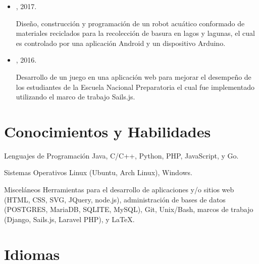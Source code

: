 \documentclass{curriculum-vitae}
\begin{document}
    \begin{itemize}
      \item {}, 2017.
        
        Diseño, construcción y programación de un robot acuático conformado de
        materiales reciclados para la recolección de basura en lagos y lagunas,
        el cual es controlado por una aplicación Android y un dispositivo
        Arduino.
        
      \item {}, 2016.

        Desarrollo de un juego en una aplicación web para mejorar el desempeño
        de los estudiantes de la Escuela Nacional Preparatoria el cual fue
        implementado utilizando el marco de trabajo Sails.js.
      
    \end{itemize}

  \section{Conocimientos y Habilidades}
  
    \skill%
      {Lenguajes de Programación}
      {Java, C/C++, Python, PHP, JavaScript, y Go.}

    \vspace{0.5em}

    \skill%
      {Sistemas Operativos}
      {Linux (Ubuntu, Arch Linux), Windows.}

    \vspace{0.5em}

    \skill%
      {Misceláneos}
      {Herramientas para el desarrollo de aplicaciones y/o sitios web (HTML,
        CSS, SVG, JQuery, node.js), administración de bases de datos (POSTGRES,
        MariaDB, SQLITE, MySQL), Git, Unix/Bash, marcos de trabajo (Django,
        Sails.js, Laravel PHP), y \LaTeX.}

  \section{Idiomas}
\end{document}
